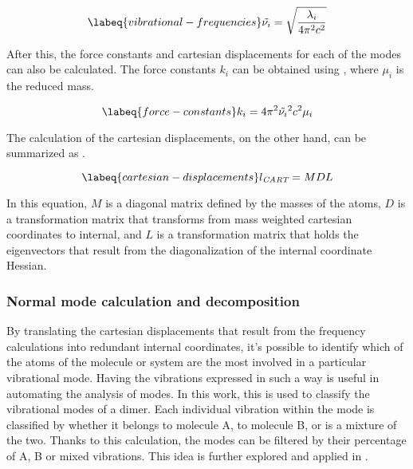 \begin{equation}
    \labeq{vibrational-frequencies}
    \tilde{\nu_i} = \sqrt{\frac{\lambda_i}{4 \pi^2 c^2}}
\end{equation}

After this, the force constants and cartesian displacements for each of the modes can also be calculated.
The force constants $k_i$ can be obtained using , where $\mu_i$ is the reduced mass.

\begin{equation}
    \labeq{force-constants}
    k_i =  4 \pi^2 \tilde{\nu_i}^2 c^2 \mu_i
\end{equation}

The calculation of the cartesian displacements, on the other hand, can be summarized as .

\begin{equation}
    \labeq{cartesian-displacements}
    l_\textit{CART} = MDL
\end{equation}

In this equation, $M$ is a diagonal matrix defined by the masses of the atoms, $D$ is a transformation matrix that transforms from mass weighted cartesian coordinates to internal, and $L$ is a transformation matrix that holds the eigenvectors that result from the diagonalization of the internal coordinate Hessian.

\subsubsection{Normal mode calculation and decomposition}
By translating the cartesian displacements that result from the frequency calculations into redundant internal coordinates, it's possible to identify which of the atoms of the molecule or system are the most involved in a particular vibrational mode.
Having the vibrations expressed in such a way is useful in automating the analysis of modes.
In this work, this is used to classify the vibrational modes of a dimer.
Each individual vibration within the mode is classified by whether it belongs to molecule A, to molecule B, or is a mixture of the two.
Thanks to this calculation, the modes can be filtered by their percentage of A, B or mixed vibrations.
This idea is further explored and applied in .

